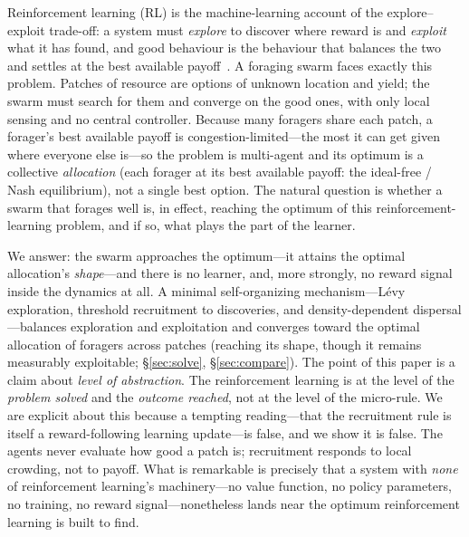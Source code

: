\documentclass{article}
\begin{document}
Reinforcement learning (RL) is the machine-learning account of the explore--exploit trade-off: a system must
\emph{explore} to discover where reward is and \emph{exploit} what it has found, and good behaviour is the
behaviour that balances the two and settles at the best available payoff~\citep{SuttonBarto2018}. A foraging
swarm faces exactly this problem. Patches of resource are options of unknown location and yield; the swarm must
search for them and converge on the good ones, with only local sensing and no central controller. Because many
foragers share each patch, a forager's best available payoff is congestion-limited---the most it can get given
where everyone else is---so the problem is multi-agent and its optimum is a collective \emph{allocation} (each
forager at its best available payoff: the ideal-free / Nash equilibrium), not a single best option. The natural
question is whether a swarm that forages well is, in effect, reaching the optimum of this
reinforcement-learning problem, and if so, what plays the part of the learner.

We answer: the swarm approaches the optimum---it attains the optimal allocation's \emph{shape}---and there is
no learner, and, more strongly, no reward signal inside the dynamics at all. A minimal
self-organizing mechanism---L\'evy exploration, threshold recruitment to discoveries, and
density-dependent dispersal---balances exploration and exploitation and converges toward the optimal allocation
of foragers across patches (reaching its shape, though it remains measurably exploitable; \S\ref{sec:solve},
\S\ref{sec:compare}). The point of this paper is a claim about \emph{level of
abstraction}. The reinforcement learning is at the level of the \emph{problem solved} and the \emph{outcome
reached}, not at the level of the micro-rule. We are explicit about this because a tempting reading---that the
recruitment rule is itself a reward-following learning update---is false, and we show it is false. The agents
never evaluate how good a patch is; recruitment responds to local crowding, not to payoff. What is remarkable
is precisely that a system with \emph{none} of reinforcement learning's machinery---no value function, no
policy parameters, no training, no reward signal---nonetheless lands near the optimum reinforcement learning is
built to find.
\end{document}
